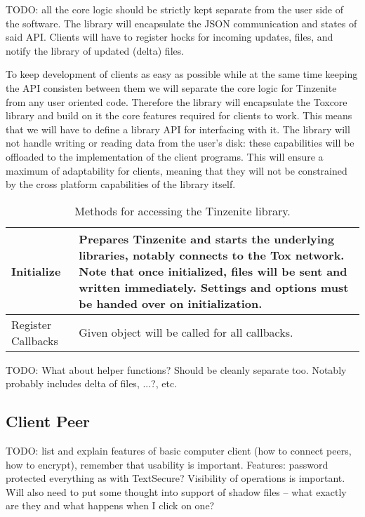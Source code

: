 TODO: all the core logic should be strictly kept separate from the user side of the software.
The library will encapsulate the JSON communication and states of said API.
Clients will have to register hocks for incoming updates, files, and notify the library of updated (delta) files.

To keep development of clients as easy as possible while at the same time keeping the API consisten between them we will separate the core logic for Tinzenite from any user oriented code.
Therefore the library will encapsulate the Toxcore library and build on it the core features required for clients to work.
This means that we will have to define a library API for interfacing with it.
The library will not handle writing or reading data from the user's disk: these capabilities will be offloaded to the implementation of the client programs.
This will ensure a maximum of adaptability for clients, meaning that they will not be constrained by the cross platform capabilities of the library itself.

\begin{table}[H]
\centering
\begin{tabulary}{\textwidth}{p{2.5cm} || J}
	Initialize & Prepares Tinzenite and starts the underlying libraries, notably connects to the Tox network. Note that once initialized, files will be sent and written immediately. Settings and options must be handed over on initialization.\\
	\hline
    Register Callbacks & Given object will be called for all callbacks.\\
\end{tabulary}
\caption[Tinzenite Library API]{Methods for accessing the Tinzenite library.}
\label{table:lib:api}
\end{table}

TODO: What about helper functions?
Should be cleanly separate too.
Notably probably includes delta of files, ...?, etc.

\subsection{Client Peer}

TODO: list and explain features of basic computer client (how to connect peers, how to encrypt), remember that usability is important.
Features: password protected everything as with TextSecure?
Visibility of operations is important.
Will also need to put some thought into support of shadow files – what exactly are they and what happens when I click on one?

